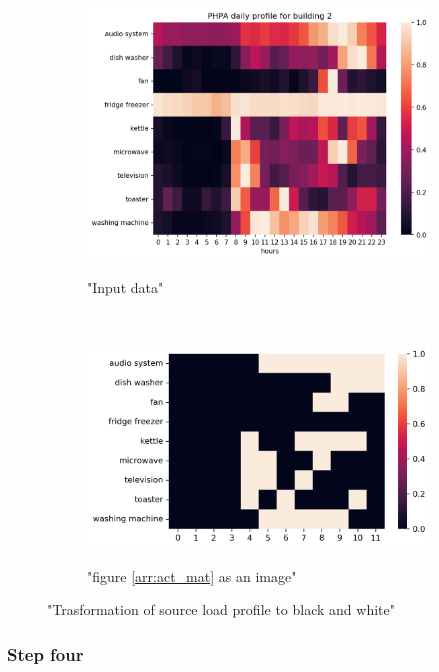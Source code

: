 \begin{figure}[H]
	\begin{subfigure}{.5\textwidth}
		\caption{"Input data"}
		\includegraphics[width=1\linewidth]{../Figures/LPS/PHPA.png}
		\label{fig:ec_PHPA}
	\end{subfigure}%
	~ 
	\begin{subfigure}{.5\textwidth}
		\caption{"figure \protect\ref{arr:act_mat} as an image"}
		\includegraphics[width=1\linewidth]{../Figures/LPS/PHPA_EC.png}
		\label{fig:ec_PHPA_bw}
	\end{subfigure}%

	\caption{"Trasformation of source load profile to black and white"}
\end{figure}

\subsubsection{Step four}

